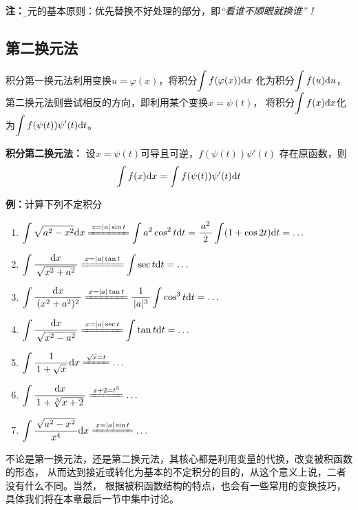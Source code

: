 {\bf 注：}{\b 换元的基本原则：优先替换不好处理的部分，即{\it “看谁不顺眼就换谁”！}}

\subsection{第二换元法}

积分第一换元法利用变换$u=\varphi(x)$，将积分$\displaystyle\int f(\varphi(x))\mathrm{d} x$
化为积分$\displaystyle\int f(u)\mathrm{d} u$，第二换元法则尝试相反的方向，即利用某个变换$x=\psi(t)$，
将积分$\displaystyle\int f(x)\mathrm{d} x$化为$\displaystyle\int f(\psi(t))\psi'(t)\mathrm{d} t$。

\begin{thx}
	{\bf 积分第二换元法：}
	设$x=\psi(t)$可导且可逆，$f(\psi(t))\psi'(t)$
	存在原函数，则
	$$\displaystyle\int f(x)\mathrm{d} x=\displaystyle\int f(\psi(t))\psi'(t)\mathrm{d} t$$
\end{thx}

{\bf 例：}计算下列不定积分
\begin{enumerate}[(1)]
  \setlength{\itemindent}{1cm}
  \item $\dint \sqrt{a^2-x^2}\d x\xlongequal{x=|a|\sin t}\dint a^2\cos^2t\d t
  =\df{a^2}2\dint(1+\cos2t)\d t=\ldots$ 
  \item $\dint\df{\d x}{\sqrt{x^2+a^2}}\xlongequal{x=|a|\tan t}
  \dint\sec t\d t=\ldots$
  \item $\dint\df{\d x}{(x^2+a^2)^2}\xlongequal{x=|a|\tan t}
  \df1{|a|^3}\dint\cos^3t\d t=\ldots$
  \item $\dint\df{\d x}{\sqrt{x^2-a^2}}\xlongequal{x=|a|\sec t}
  \dint\tan t\d t=\ldots$ 
  \item $\dint \df{1}{1+\sqrt x}\d x\xlongequal{\sqrt x=t}\ldots$ 
  \item $\dint\df{\d x}{1+\sqrt[3]{x+2}}\xlongequal{x+2=t^3}\ldots$ 
  \item $\dint\df{\sqrt{a^2-x^2}}{x^4}\d x\xlongequal{x=|a|\sin t}\ldots$
\end{enumerate}

不论是第一换元法，还是第二换元法，其核心都是利用变量的代换，改变被积函数的形态，
从而达到接近或转化为基本的不定积分的目的，从这个意义上说，二者没有什么不同。当然，
根据被积函数结构的特点，也会有一些常用的变换技巧，具体我们将在本章最后一节中集中讨论。

